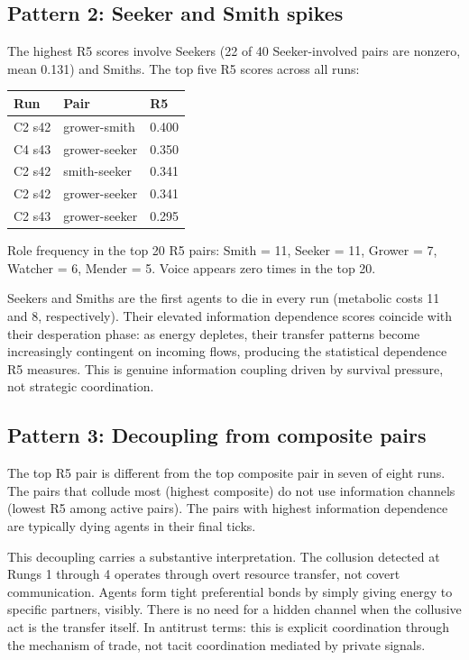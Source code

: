 \documentclass[10pt,a4paper]{article}
\begin{document}
\subsection{Pattern 2: Seeker and Smith spikes}

The highest R5 scores involve Seekers (22 of 40 Seeker-involved pairs are nonzero, mean 0.131) and Smiths. The top five R5 scores across all runs:

\begin{table}[H]
\centering\small
\begin{tabular}{lll}
\hline
Run & Pair & R5 \\
\hline
C2 s42 & grower-smith & 0.400 \\
C4 s43 & grower-seeker & 0.350 \\
C2 s42 & smith-seeker & 0.341 \\
C2 s42 & grower-seeker & 0.341 \\
C2 s43 & grower-seeker & 0.295 \\
\hline
\end{tabular}
\end{table}

Role frequency in the top 20 R5 pairs: Smith = 11, Seeker = 11, Grower = 7, Watcher = 6, Mender = 5. Voice appears zero times in the top 20.

Seekers and Smiths are the first agents to die in every run (metabolic costs 11 and 8, respectively). Their elevated information dependence scores coincide with their desperation phase: as energy depletes, their transfer patterns become increasingly contingent on incoming flows, producing the statistical dependence R5 measures. This is genuine information coupling driven by survival pressure, not strategic coordination.

\subsection{Pattern 3: Decoupling from composite pairs}

The top R5 pair is different from the top composite pair in seven of eight runs. The pairs that collude most (highest composite) do not use information channels (lowest R5 among active pairs). The pairs with highest information dependence are typically dying agents in their final ticks.

This decoupling carries a substantive interpretation. The collusion detected at Rungs 1 through 4 operates through overt resource transfer, not covert communication. Agents form tight preferential bonds by simply giving energy to specific partners, visibly. There is no need for a hidden channel when the collusive act is the transfer itself. In antitrust terms: this is explicit coordination through the mechanism of trade, not tacit coordination mediated by private signals.
\end{document}
